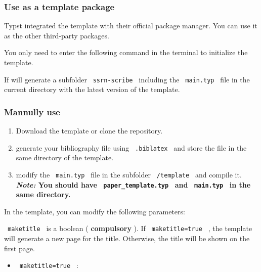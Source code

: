\subsubsection{Use as a template
package}\label{use-as-a-template-package}

Typst integrated the template with their official package manager. You
can use it as the other third-party packages.

You only need to enter the following command in the terminal to
initialize the template.

\begin{Shaded}
\begin{Highlighting}[]
\end{Highlighting}
\end{Shaded}

If will generate a subfolder \texttt{\ ssrn-scribe\ } including the
\texttt{\ main.typ\ } file in the current directory with the latest
version of the template.

\subsubsection{Mannully use}\label{mannully-use}

\begin{enumerate}
\tightlist
\item
  Download the template or clone the repository.
\item
  generate your bibliography file using \texttt{\ .biblatex\ } and store
  the file in the same directory of the template.
\item
  modify the \texttt{\ main.typ\ } file in the subfolder
  \texttt{\ /template\ } and compile it. \textbf{\emph{Note:} You should
  have \texttt{\ paper\_template.typ\ } and \texttt{\ main.typ\ } in the
  same directory.}
\end{enumerate}

In the template, you can modify the following parameters:

\texttt{\ maketitle\ } is a boolean ( \textbf{compulsory} ). If
\texttt{\ maketitle=true\ } , the template will generate a new page for
the title. Otherwise, the title will be shown on the first page.

\begin{itemize}
\tightlist
\item
  \texttt{\ maketitle=true\ } :
\end{itemize}

